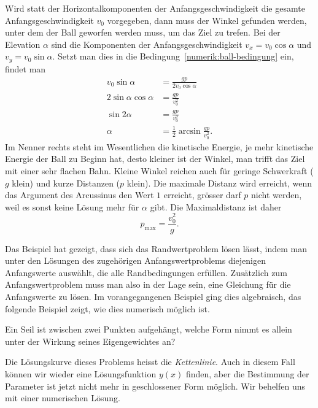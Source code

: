Wird statt der Horizontalkomponenten der Anfangsgeschwindigkeit die
gesamte Anfangsgeschwindigkeit $v_0$ vorgegeben, dann muss der
Winkel gefunden werden, unter dem der Ball geworfen werden muss,
um das Ziel zu trefen.
%
Bei der Elevation $\alpha$ sind die Komponenten der Anfangsgeschwindigkeit
$v_x=v_0\cos\alpha$ und $v_y=v_0\sin\alpha$. 
Setzt man dies in die Bedingung~\eqref{numerik:ball-bedingung} ein,
findet man
\begin{align*}
v_0 \sin \alpha &=\frac{gp}{2v_0\cos\alpha}
\\
2\sin\alpha\cos\alpha&=\frac{gp}{v_0^2}
\\
\sin2\alpha&=\frac{gp}{v_0^2}
\\
\alpha&= \frac12 \arcsin\frac{gp}{v_0^2}.
\end{align*}
Im Nenner rechts steht im Wesentlichen die kinetische Energie,
je mehr kinetische Energie der Ball zu Beginn hat, desto kleiner
ist der Winkel, man trifft das Ziel mit einer sehr flachen Bahn.
%
%
Kleine Winkel reichen auch für geringe Schwerkraft ($g$ klein)
und kurze Distanzen ($p$ klein).
Die maximale Distanz wird erreicht, wenn das Argument des Arcussinus
den Wert $1$ erreicht, grösser darf $p$ nicht werden, weil es sonst
keine Lösung mehr für $\alpha$ gibt.
%
Die Maximaldistanz ist daher
\[
p_{\text{max}} = \frac{v_0^2}{g}.
\]

Das Beispiel hat gezeigt, dass sich das Randwertproblem lösen lässt,
indem man unter den Lösungen des zugehörigen Anfangswertproblems
diejenigen Anfangswerte auswählt, die alle Randbedingungen erfüllen.
Zusätzlich zum Anfangswertproblem muss man also in der Lage sein,
eine Gleichung für die Anfangswerte zu lösen.
Im vorangegangenen Beispiel ging dies algebraisch, das folgende Beispiel
zeigt, wie dies numerisch möglich ist.

\begin{aufgabe}
\label{numerik:aufgabe-seil}
Ein Seil ist zwischen zwei Punkten aufgehängt, welche Form nimmt es
allein unter der Wirkung seines Eigengewichtes an?
\end{aufgabe}
Die Lösungskurve dieses Problems heisst die {\em Kettenlinie}.
%
Auch in diesem Fall können wir wieder eine Lösungsfunktion $y(x)$ finden,
aber die Bestimmung der Parameter ist jetzt nicht mehr in geschlossener
Form möglich.
Wir behelfen uns mit einer numerischen Lösung.

